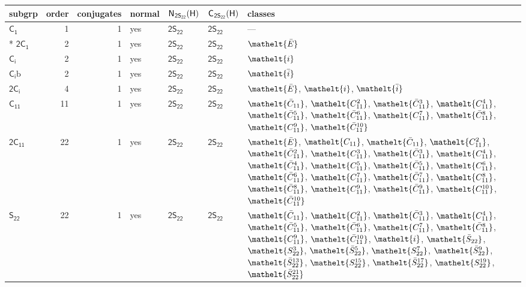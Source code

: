 \documentclass[10pt,a4paper]{article}
\numberwithin{equation}{section}
\newcommand{\eltfont}[1]{{\let\sigma\eltsigma\mathelt{#1}}}
\newcommand{\grp}[1]{\mathsf{#1}}
\newcommand{\cls}[1]{\eltfont{#1}}
\newcommand{\barred}[1]{\bar{#1}}
\newcommand{\secondclass}{\mathrm{b}}
\newcommand{\hairsp}{\mkern1mu}
\newlength{\fillwidth}\newlength{\cellwidth}\newlength{\colwidth}
\begin{document}
{\begin{longtable}{@{}lrrlll>{\RaggedRight\arraybackslash}p{\fillwidth}@{}}
subgrp & order & conjugates & normal & $\grp{N}_{\hairsp \grp{2S_{22}}}(\grp{H})$ & $\grp{C}_{\hairsp \grp{2S_{22}}}(\grp{H})$ & classes\\\midrule\endhead
\bottomrule\endfoot\endlastfoot
\href{C1.pdf}{$\grp{C_{1}}$} & 1 & 1 & yes & \href{2S22.pdf}{$\grp{2S_{22}}$} & \href{2S22.pdf}{$\grp{2S_{22}}$} & ---\\*
\href{2C1.pdf}{$\grp{2C_{1}}$} & 2 & 1 & yes & \href{2S22.pdf}{$\grp{2S_{22}}$} & \href{2S22.pdf}{$\grp{2S_{22}}$} & $\cls{\barred{E}}$\\
\href{S2.pdf}{$\grp{C_{i}}$} & 2 & 1 & yes & \href{2S22.pdf}{$\grp{2S_{22}}$} & \href{2S22.pdf}{$\grp{2S_{22}}$} & $\cls{i}$\\
\href{S2b.pdf}{$\grp{C_{i}}\secondclass$} & 2 & 1 & yes & \href{2S22.pdf}{$\grp{2S_{22}}$} & \href{2S22.pdf}{$\grp{2S_{22}}$} & $\cls{\barred{i}}$\\
\href{2S2.pdf}{$\grp{2C_{i}}$} & 4 & 1 & yes & \href{2S22.pdf}{$\grp{2S_{22}}$} & \href{2S22.pdf}{$\grp{2S_{22}}$} & $\cls{\barred{E}}$, $\cls{i}$, $\cls{\barred{i}}$\\
\href{C11.pdf}{$\grp{C_{11}}$} & 11 & 1 & yes & \href{2S22.pdf}{$\grp{2S_{22}}$} & \href{2S22.pdf}{$\grp{2S_{22}}$} & $\cls{\barred{C}_{11}}$, $\cls{C_{11}^{2}}$, $\cls{\barred{C}_{11}^{3}}$, $\cls{C_{11}^{4}}$, $\cls{\barred{C}_{11}^{5}}$, $\cls{\barred{C}_{11}^{6}}$, $\cls{C_{11}^{7}}$, $\cls{\barred{C}_{11}^{8}}$, $\cls{C_{11}^{9}}$, $\cls{\barred{C}_{11}^{10}}$\\
\href{2C11.pdf}{$\grp{2C_{11}}$} & 22 & 1 & yes & \href{2S22.pdf}{$\grp{2S_{22}}$} & \href{2S22.pdf}{$\grp{2S_{22}}$} & $\cls{\barred{E}}$, $\cls{C_{11}}$, $\cls{\barred{C}_{11}}$, $\cls{C_{11}^{2}}$, $\cls{\barred{C}_{11}^{2}}$, $\cls{C_{11}^{3}}$, $\cls{\barred{C}_{11}^{3}}$, $\cls{C_{11}^{4}}$, $\cls{\barred{C}_{11}^{4}}$, $\cls{C_{11}^{5}}$, $\cls{\barred{C}_{11}^{5}}$, $\cls{C_{11}^{6}}$, $\cls{\barred{C}_{11}^{6}}$, $\cls{C_{11}^{7}}$, $\cls{\barred{C}_{11}^{7}}$, $\cls{C_{11}^{8}}$, $\cls{\barred{C}_{11}^{8}}$, $\cls{C_{11}^{9}}$, $\cls{\barred{C}_{11}^{9}}$, $\cls{C_{11}^{10}}$, $\cls{\barred{C}_{11}^{10}}$\\
\href{S22.pdf}{$\grp{S_{22}}$} & 22 & 1 & yes & \href{2S22.pdf}{$\grp{2S_{22}}$} & \href{2S22.pdf}{$\grp{2S_{22}}$} & $\cls{\barred{C}_{11}}$, $\cls{C_{11}^{2}}$, $\cls{\barred{C}_{11}^{3}}$, $\cls{C_{11}^{4}}$, $\cls{\barred{C}_{11}^{5}}$, $\cls{\barred{C}_{11}^{6}}$, $\cls{C_{11}^{7}}$, $\cls{\barred{C}_{11}^{8}}$, $\cls{C_{11}^{9}}$, $\cls{\barred{C}_{11}^{10}}$, $\cls{i}$, $\cls{\barred{S}_{22}}$, $\cls{S_{22}^{3}}$, $\cls{\barred{S}_{22}^{5}}$, $\cls{S_{22}^{7}}$, $\cls{\barred{S}_{22}^{9}}$, $\cls{\barred{S}_{22}^{13}}$, $\cls{S_{22}^{15}}$, $\cls{\barred{S}_{22}^{17}}$, $\cls{S_{22}^{19}}$, $\cls{\barred{S}_{22}^{21}}$\\

\end{longtable}}
\end{document}
